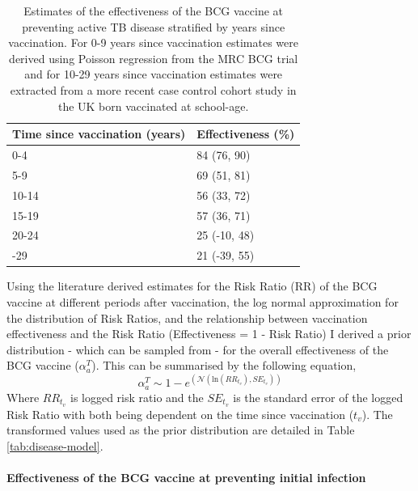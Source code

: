 \documentclass[11pt,twoside]{bristolthesis}
\begin{document}
  \begin{table}[!h]
  
  \caption[Estimates of the effectiveness of the BCG vaccine at preventing active TB disease stratified by years since vaccination.]{\label{tab:bcg-eff-est}Estimates of the effectiveness of the BCG vaccine at preventing active TB disease stratified by years since vaccination. For 0-9 years since vaccination estimates were derived using Poisson regression from the MRC BCG trial and for 10-29 years since vaccination estimates were extracted from a more recent case control cohort study in the UK born vaccinated at school-age.}
  \centering
  \begin{tabular}{ll}
  \toprule
  Time since vaccination (years) & Effectiveness (\%)\\
  \midrule
  0-4 & 84 (76, 90)\\
  5-9 & 69 (51, 81)\\
  10-14 & 56 (33, 72)\\
  15-19 & 57 (36, 71)\\
  20-24 & 25 (-10, 48)\\
  \addlinespace
  25-29 & 21 (-39, 55)\\
  \bottomrule
  \end{tabular}
  \end{table}
  Using the literature derived estimates for the Risk Ratio (RR) of the BCG vaccine at different periods after vaccination, the log normal approximation for the distribution of Risk Ratios, and the relationship between vaccination effectiveness and the Risk Ratio (Effectiveness = 1 - Risk Ratio) I derived a prior distribution - which can be sampled from - for the overall effectiveness of the BCG vaccine (\(\alpha^T_a\)). This can be summarised by the following equation,
  \begin{equation}
    \alpha^T_a \sim 1 - e^{\left(\mathcal{N}(\text{ln}(RR_{t_v}), SE_{t_v})\right)}
    \label{eq:rr-to-alpha}
  \end{equation}
  Where \(RR_{t_v}\) is logged risk ratio and the \(SE_{t_v}\) is the standard error of the logged Risk Ratio with both being dependent on the time since vaccination (\(t_v\)). The transformed values used as the prior distribution are detailed in Table \ref{tab:disease-model}.
  
  \hypertarget{effectiveness-of-the-bcg-vaccine-at-preventing-initial-infection}{%
  \paragraph{Effectiveness of the BCG vaccine at preventing initial infection}\label{effectiveness-of-the-bcg-vaccine-at-preventing-initial-infection}}
  
\end{document}
